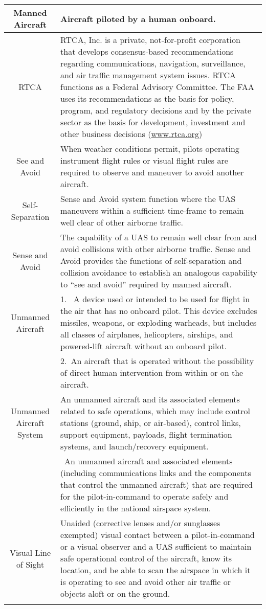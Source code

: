 \begin{tabularx}{\textwidth}{S{0.22}|X}
     Manned Aircraft & Aircraft piloted by a human onboard.\\\hline
     RTCA & RTCA, Inc. is a private, not-for-profit corporation that develops consensus-based recommendations regarding communications, navigation, surveillance, and air traffic management system issues. RTCA functions as a Federal Advisory Committee. The FAA uses its recommendations as the basis for policy, program, and regulatory decisions and by the private sector as the basis for development, investment and other business decisions  (\url{www.rtca.org})\\\hline
     See and Avoid & When weather conditions permit, pilots operating instrument flight rules or visual flight rules are required to observe and maneuver to avoid another aircraft. \\\hline
     Self-Separation & Sense and Avoid system function where the UAS maneuvers within a sufficient time-frame to remain well clear of other airborne traffic.\\\hline 
     Sense and Avoid & The capability of a UAS to remain well clear from and avoid collisions with other airborne traffic. Sense and Avoid provides the functions of self-separation and collision avoidance to establish an analogous capability to “see and avoid” required by manned aircraft.\\\hline
     Unmanned Aircraft & 1.~ A device used or intended to be used for flight in the air that has no onboard pilot. This device excludes missiles, weapons, or exploding warheads, but includes all classes of airplanes, helicopters, airships, and powered-lift aircraft without an onboard pilot.\\
     &2.~An aircraft that is operated without the possibility of direct human intervention from within or on the aircraft.\\\hline
     Unmanned Aircraft System & An unmanned aircraft and its associated elements related to safe operations, which may include control stations (ground, ship, or air-based), control links, support equipment, payloads, flight termination systems, and launch/recovery equipment.\\
     &~An unmanned aircraft and associated elements (including communications links and the components that control the unmanned aircraft) that are required for the pilot-in-command to operate safely and efficiently in the national airspace system. \\\hline
     Visual Line of Sight & Unaided (corrective lenses and/or sunglasses exempted) visual contact between a pilot-in-command or a visual observer and a UAS sufficient to maintain safe operational control of the aircraft, know its location, and be able to scan the airspace in which it is operating to see and avoid other air traffic or objects aloft or on the ground.\\
     \caption{Terminology}
     \label{tab:TerminologyExplanation}
\end{tabularx}

